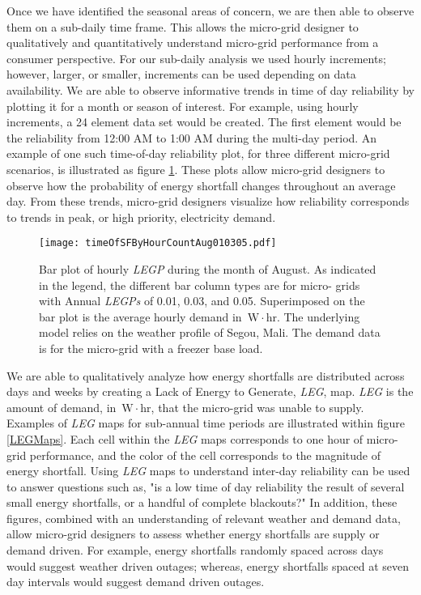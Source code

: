 \documentclass{article}
\newcommand{\unit}[1]{\ensuremath{\, \mathrm{#1}}}
\begin{document}

Once we have identified the seasonal areas of concern, we are then able to observe them on a sub-daily time frame. 
This allows the micro-grid designer to qualitatively and quantitatively understand micro-grid performance from a consumer perspective. 
For our sub-daily analysis we used hourly increments; however, larger, or smaller, increments can be used depending on data availability.
%
%
We are able to observe informative trends in time of day reliability by plotting it for a month or season of interest. 
For example, using hourly increments, a 24 element data set would be created.
The first element would be the reliability from 12:00 AM to 1:00 AM during the multi-day period.
An example of one such time-of-day reliability plot, for three different micro-grid scenarios, is illustrated as figure \ref{HourBar}.
These plots allow micro-grid designers to observe how the probability of energy shortfall changes throughout an average day.
From these trends, micro-grid designers visualize how reliability corresponds to trends in peak, or high priority, electricity demand. 



\begin{figure}[ht] 
  \centering
    \texttt{[image: timeOfSFByHourCountAug010305.pdf]}
  \caption{Bar plot of hourly \emph{LEGP} during the month of August. 
  As indicated in the legend, the different bar column types are for micro-	
  grids with Annual \emph{LEGPs} of 0.01, 0.03, and 0.05.
  Superimposed on the bar plot is the average hourly demand in \unit{W\! \cdot \! hr}.
  The underlying model relies on the weather profile of Segou, Mali.
  The demand data is for the micro-grid with a freezer base load.}
\label{HourBar}
\end{figure}



We are able to qualitatively analyze how energy shortfalls are distributed across days and weeks by creating a Lack of Energy to Generate, \emph{LEG}, map. 
\emph{LEG} is the amount of demand, in \unit{W\! \cdot \! hr}, that the micro-grid was unable to supply.
Examples of \emph{LEG} maps for sub-annual time periods are illustrated within figure \ref{LEGMaps}.
Each cell within the \emph{LEG} maps corresponds to one hour of micro-grid performance, and the color of the cell corresponds to the magnitude of energy shortfall. 
Using \emph{LEG} maps to understand inter-day reliability can be used to answer questions such as, "is a low time of day reliability the result of several small energy shortfalls, or a handful of complete blackouts?" 
In addition, these figures, combined with an understanding of relevant weather and demand data, allow micro-grid designers to assess whether energy shortfalls are supply or demand driven. 
For example, energy shortfalls randomly spaced across days would suggest weather driven outages; whereas, energy shortfalls spaced at seven day intervals would suggest demand driven outages. 
\end{document}
